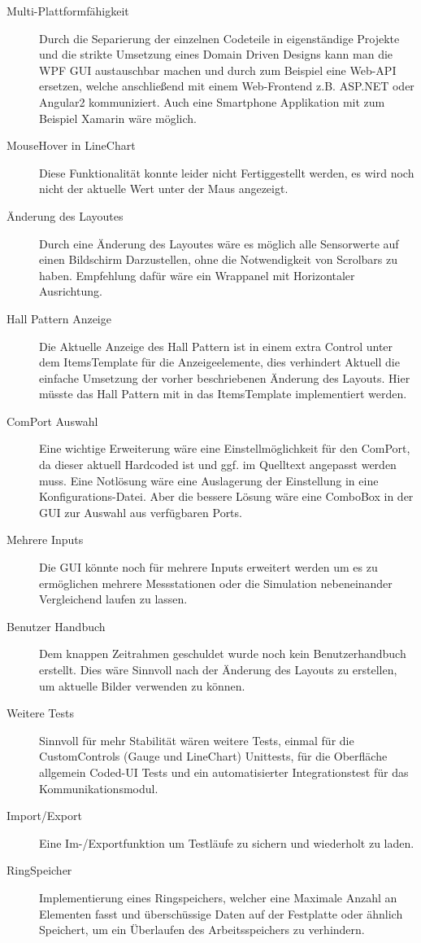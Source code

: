 \begin{description}
\item[Multi-Plattformfähigkeit] Durch die Separierung der einzelnen Codeteile in eigenständige Projekte und die strikte Umsetzung eines Domain Driven Designs kann man die WPF GUI austauschbar machen und durch zum Beispiel eine Web-API ersetzen, welche anschließend mit einem Web-Frontend z.B. ASP.NET oder Angular2 kommuniziert. Auch eine Smartphone Applikation mit zum Beispiel Xamarin wäre möglich.
\item[MouseHover in LineChart] Diese Funktionalität konnte leider nicht Fertiggestellt werden, es wird noch nicht der aktuelle Wert unter der Maus angezeigt.
\item[Änderung des Layoutes] Durch eine Änderung des Layoutes wäre es möglich alle Sensorwerte auf einen Bildschirm Darzustellen, ohne die Notwendigkeit von Scrolbars zu haben. Empfehlung dafür wäre ein Wrappanel mit Horizontaler Ausrichtung.
\item[Hall Pattern Anzeige] Die Aktuelle Anzeige des Hall Pattern ist in einem extra Control unter dem ItemsTemplate für die Anzeigeelemente, dies verhindert Aktuell die einfache Umsetzung der vorher beschriebenen Änderung des Layouts. Hier müsste das Hall Pattern mit in das ItemsTemplate implementiert werden.
\item[ComPort Auswahl] Eine wichtige Erweiterung wäre eine Einstellmöglichkeit für den ComPort, da dieser aktuell Hardcoded ist und ggf. im Quelltext angepasst werden muss. Eine Notlösung wäre eine Auslagerung der Einstellung in eine Konfigurations-Datei. Aber die bessere Lösung wäre eine ComboBox in der GUI zur Auswahl aus verfügbaren Ports. 
\item[Mehrere Inputs] Die GUI könnte noch für mehrere Inputs erweitert werden um es zu ermöglichen mehrere Messstationen oder die Simulation nebeneinander Vergleichend laufen zu lassen.
\item[Benutzer Handbuch] Dem knappen Zeitrahmen geschuldet wurde noch kein Benutzerhandbuch erstellt. Dies wäre Sinnvoll nach der Änderung des Layouts zu erstellen, um aktuelle Bilder verwenden zu können.
\item[Weitere Tests] Sinnvoll für mehr Stabilität wären weitere Tests, einmal für die CustomControls (Gauge und LineChart) Unittests, für die Oberfläche allgemein Coded-UI Tests und ein automatisierter Integrationstest für das Kommunikationsmodul.
\item[Import/Export] Eine Im-/Exportfunktion um Testläufe zu sichern und wiederholt zu laden.
\item[RingSpeicher] Implementierung eines Ringspeichers, welcher eine Maximale Anzahl an Elementen fasst und überschüssige Daten auf der Festplatte oder ähnlich Speichert, um ein Überlaufen des Arbeitsspeichers zu verhindern.
\end{description}

